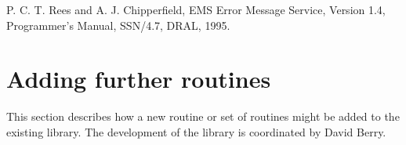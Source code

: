 \documentclass[11pt,twoside,nolof]{starlink}
\begin{document}
{{         P. C. T. Rees and A. J. Chipperfield, EMS Error Message Service,
            Version 1.4, Programmer's Manual,
            SSN/4.7, DRAL, 1995.
   }
}


\section{Adding further routines}

   This section describes how a new routine or set of routines might be
   added to the existing library.
   The development of the library is coordinated by David Berry.
\end{document}
